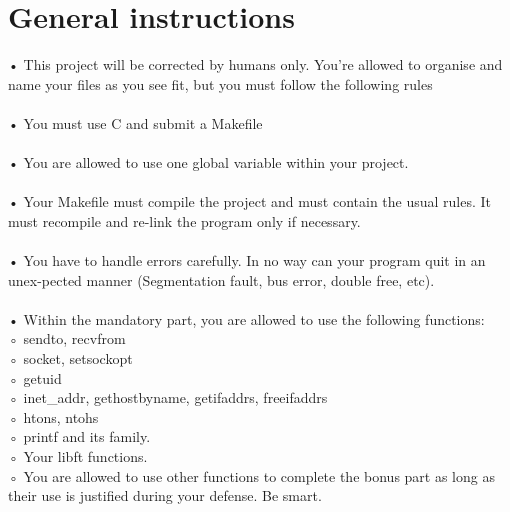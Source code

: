 \documentclass{42-en}
\begin{document}
\chapter{General instructions}

    • This project will be corrected by humans only. You’re allowed to organise and name your files as you see fit, but you must follow the following rules\\
    \\
    • You must use C and submit a Makefile\\
    \\
    • You are allowed to use one global variable within your project.\\
    \\
    • Your Makefile must compile the project and must contain the usual rules. It must recompile and re-link the program only if necessary.\\
    \\
    • You have to handle errors carefully. In no way can your program quit in an unex-pected manner (Segmentation fault, bus error, double free, etc).\\
    \\
    • Within the mandatory part, you are allowed to use the following functions:\\

          ◦ sendto, recvfrom\\

          ◦ socket, setsockopt\\  

          ◦ getuid\\

          ◦ inet\_addr, gethostbyname, getifaddrs, freeifaddrs\\ 

          ◦ htons, ntohs\\  

          ◦ printf and its family.\\  

          ◦ Your libft functions.\\    

          ◦ You are allowed to use other functions to complete the bonus part as long as their use is justified during your defense. Be smart.\\




\end{document}
